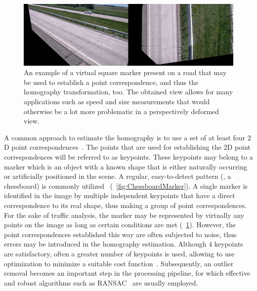 \begin{figure}[t]
    \centerline{\includegraphics[width=\linewidth]{figures/homography/homography_road.png}}
    \caption[Square marker on a road]{An example of a virtual square marker present on a road that may be used to establish a point correspondence, and thus the homography transformation, too. The obtained view allows for many applications such as speed and size measurements that would otherwise be a lot more problematic in a perspectively deformed view. }
    \label{fig:RoadMarker}
\end{figure}

A common approach to estimate the homography is to use a set of at least four $2$D point correspondences~\cite{hartley1997defense}. The points that are used for establishing the $2$D point correspondences will be referred to as keypoints. These keypoints may belong to a marker which is an object with a known shape that is either naturally occurring or artificially positioned in the scene. A regular, easy-to-detect pattern (\egtext{}, a chessboard) is commonly utilized~\cite{zhang2016flexible} (\figtext{}~\ref{fig:ChessboardMarker}). A single marker is identified in the image by multiple independent keypoints that have a direct correspondence to its real shape, thus making a group of point correspondences. For the sake of traffic analysis, the marker may be represented by virtually any points on the image as long as certain conditions are met (\figtext{}~\ref{fig:RoadMarker}). However, the point correspondences established this way are often subjected to noise, thus errors may be introduced in the homography estimation. Although $4$ keypoints are satisfactory, often a greater number of keypoints is used, allowing to use optimization to minimize a suitable cost function~\cite{osuna2016multiobjective, mou2013robust}. Subsequently, an outlier removal becomes an important step in the processing pipeline, for which effective and robust algorithms such as RANSAC~\cite{fischler1981ransac} are usually employed.

